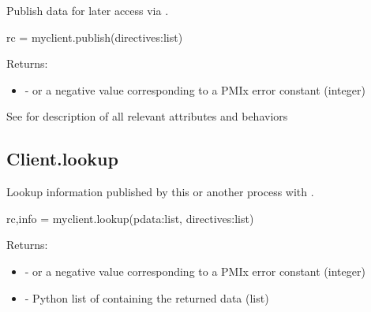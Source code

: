 \summary

Publish data for later access via .

\format

\pyspecificstart
\begin{codepar}
rc = myclient.publish(directives:list)
\end{codepar}
\pyspecificend

\begin{arglist}
\end{arglist}

Returns:

\begin{itemize}
    \item {} -  or a negative value corresponding to a PMIx error constant (integer)
\end{itemize}


See  for description of all relevant attributes and behaviors



\subsection{Client.lookup}

\summary

Lookup information published by this or another process with .

\format

\pyspecificstart
\begin{codepar}
rc,info = myclient.lookup(pdata:list, directives:list)
\end{codepar}
\pyspecificend

\begin{arglist}
\end{arglist}

Returns:

\begin{itemize}
    \item {} -  or a negative value corresponding to a PMIx error constant (integer)
    \item {} - Python list of  containing the returned data (list)
\end{itemize}


